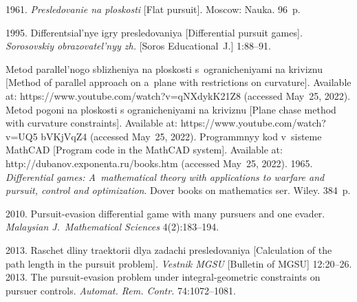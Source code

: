   \begin{multicols}{2}

\renewcommand{\bibname}{\protect\rmfamily References}

{\small\frenchspacing
 { %
 \begin{thebibliography}{99}
 
 \vspace*{-2pt}

 1961. \textit{Presledovanie na ploskosti} [Flat 
pursuit]. Moscow: Nauka. 96~p.

 1995. Differentsial'nye igry presledovaniya [Differential pursuit 
games]. \textit{Sorosovskiy obrazovatel'nyy zh.} [Soros Educational~J.] 1:88--91.

Metod parallel'nogo sblizheniya na ploskosti s~og\-ra\-ni\-che\-ni\-yami na kriviznu [Method of 
parallel approach on a~plane with restrictions on curvature]. Available at: {\sf 
https://www.youtube.com/watch?v=qNXdykK21Z8} (accessed May~25, 2022).
Metod pogoni na ploskosti s ogranicheniyami na kriviznu [Plane chase method with curvature 
constraints]. Available  at:  {\sf https://www.youtube.com/watch?v=UQ5 bVKjVqZ4} 
(accessed May~25, 2022).
Programmnyy kod v~sisteme MathCAD [Program code in the MathCAD system]. Available 
at: {\sf http://\linebreak dubanov.exponenta.ru/books.htm} (accessed May~25, 2022).
 1965.
\textit{Differential games: A~mathematical theory with applications to warfare and pursuit, control and optimization}.
Dover books on mathematics ser. Wiley. 384~p.
{

}

 2010. Pursuit-evasion differential game with 
many pursuers and one evader. \textit{Malaysian J.~Mathematical Sciences} 4(2):183--194.

 2013. Raschet dliny traektorii dlya zadachi 
presledovaniya [Calculation of the path length in the pursuit problem]. \textit{Vestnik MGSU} 
[Bulletin of MGSU] 12:20--26.
 2013. The pursuit-evasion problem under integral-geometric 
constraints on pursuer controls. \textit{Automat. Rem. Contr.} 74:1072--1081.


\end{thebibliography}}}
\end{multicols}
